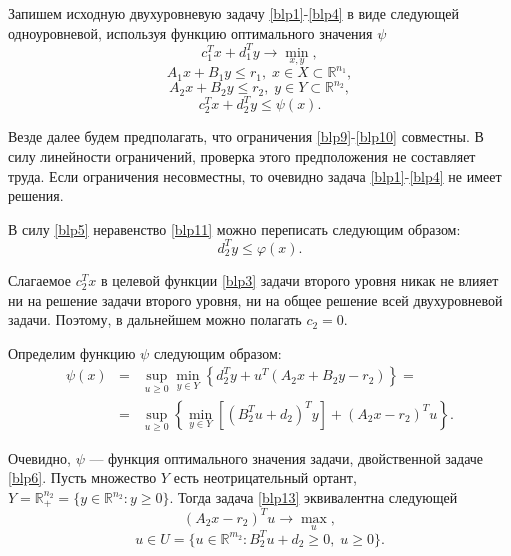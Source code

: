 Запишем исходную двухуровневую задачу \eqref{blp1}-\eqref{blp4} в виде следующей одноуровневой, используя функцию оптимального значения $\psi$
\begin{equation}
c_1^Tx+d_1^Ty\rightarrow\min_{x,y},
\label{blp8}
\end{equation}
\begin{equation}
A_1x+B_1y\leqslant r_1,\;x\in X\subset\mathbb{R}^{n_1},
\label{blp9}
\end{equation}
\begin{equation}
A_2x+B_2y\leqslant r_2,\;y\in Y\subset\mathbb{R}^{n_2},
\label{blp10}
\end{equation}
\begin{equation}
c_2^Tx+d_2^Ty\leqslant \psi(x).
\label{blp11}
\end{equation}

Везде далее будем предполагать, что ограничения \eqref{blp9}-\eqref{blp10} совместны. В силу линейности ограничений, проверка этого предположения не составляет труда. 
Если ограничения несовместны, то очевидно задача \eqref{blp1}-\eqref{blp4} не имеет решения.

В силу \eqref{blp5} неравенство \eqref{blp11} можно переписать следующим образом:
\begin{equation}
d_2^Ty\leqslant \varphi(x).
\label{blp12}
\end{equation}

Слагаемое $c_2^Tx$ в целевой функции \eqref{blp3} задачи второго уровня никак не влияет ни на решение задачи второго уровня, ни на общее решение всей двухуровневой задачи. 
Поэтому, в дальнейшем можно полагать $c_2=0$.

Определим функцию $\psi$ следующим образом:
\begin{eqnarray}
\psi(x)&=&\sup_{u\geqslant 0}\min_{y\in Y}\left\{d^T_2y+u^T(A_2x+B_2y-r_2)\right\}=\nonumber\\
&=&\sup_{u\geqslant 0}\left\{\min_{y\in Y}\left[(B_2^Tu+d_2)^Ty\right]+(A_2x-r_2)^Tu\right\}.\label{blp13}
\end{eqnarray}

Очевидно, $\psi$ --- функция оптимального значения задачи, двойственной задаче \eqref{blp6}. 
Пусть множество $Y$ есть неотрицательный ортант, $Y=\mathbb{R}^{n_2}_{+}=\{y\in\mathbb{R}^{n_2}: y\geqslant 0\}$. Тогда задача \eqref{blp13} эквивалентна следующей
\begin{equation}
(A_2x-r_2)^Tu\rightarrow\max_u,
\label{du1}
\end{equation}
\begin{equation}
u\in U=\{u\in\mathbb{R}^{m_2}:B_2^Tu+d_2\geqslant 0, \; u\geqslant 0\}.
\label{du2}
\end{equation}

